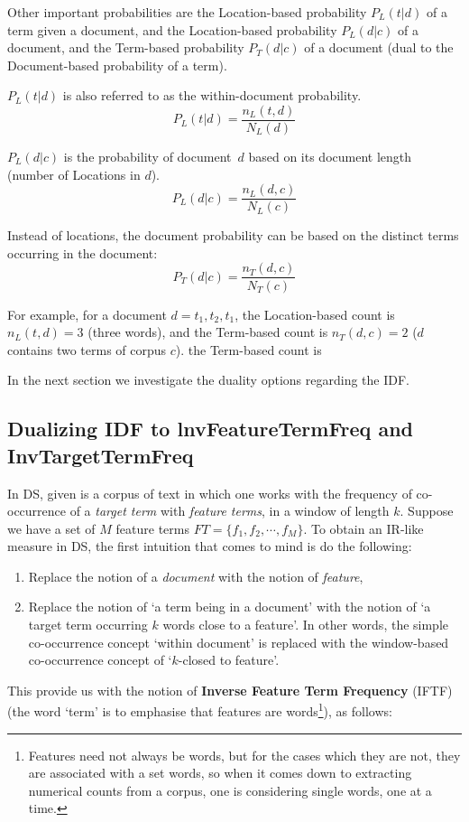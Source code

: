 Other important probabilities are
the Location-based probability $P_L(t|d)$ of a term given a document, and
the Location-based probability $P_L(d|c)$ of a document, and
the Term-based probability $P_T(d|c)$ of a document (dual to the Document-based probability of a term).

$P_L(t|d)$ is also referred to as the within-document probability.
\[
P_L(t|d) = \frac{n_L(t,d)}{N_L(d)}
\]

$P_L(d|c)$ is the probability of document~$d$ based on its document length
(number of Locations in $d$).
\[
P_L(d|c) = \frac{n_L(d,c)}{N_L(c)}
\]

Instead of locations, the document probability can be based on
the distinct terms occurring in the document:
\[
P_T(d|c) = \frac{n_T(d,c)}{N_T(c)}
\]

For example, for a document $d=t_1,t_2,t_1$, the Location-based count
is $n_L(t,d)=3$ (three words), and the Term-based count is
$n_T(d,c)=2$ ($d$ contains two terms of corpus $c$). the Term-based count is

In the next section we investigate the duality options regarding the IDF.

\subsection{Dualizing IDF to lnvFeatureTermFreq and InvTargetTermFreq}
\label{subsec-IDF}


\medskip
In DS, given is a corpus of text in which one works with the frequency of co-occurrence of a \emph{target term} with \emph{feature terms},
in a window of length $k$.
%
Suppose we have a set of  $M$ feature terms  $FT = \{f_1, f_2, \cdots, f_M\}$.  To obtain an IR-like measure in DS, the first intuition that comes to mind is do the following:

\begin{enumerate}
\item   Replace the notion of a  \emph{document}  with the notion of  \emph{feature}, 
\item  Replace the notion of `a term being in a document'  with the notion of `a target  term occurring $k$ words close to a feature'.  In other words,  the  simple co-occurrence concept `within document' is replaced with the window-based co-occurrence concept of  `$k$-closed to feature'. 
\end{enumerate}

This provide  us with the notion of {\bf Inverse Feature Term Frequency}  (IFTF)  (the word `term'  is to emphasise that features are words\footnote{Features need not always be words, but for the cases which they are not, they are associated with a set words, so when it comes down to extracting numerical counts from a corpus, one is considering single words, one at a time. }),   as follows:

